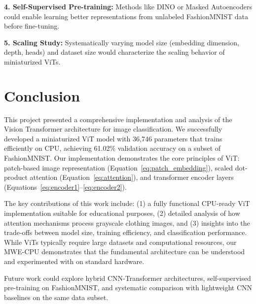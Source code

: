 \documentclass{article}
\begin{document}
\textbf{4. Self-Supervised Pre-training:} Methods like DINO \citep{caron2021dino} or Masked Autoencoders could enable learning better representations from unlabeled FashionMNIST data before fine-tuning.

\textbf{5. Scaling Study:} Systematically varying model size (embedding dimension, depth, heads) and dataset size would characterize the scaling behavior of miniaturized ViTs.

\section{Conclusion}

This project presented a comprehensive implementation and analysis of the Vision Transformer architecture for image classification. We successfully developed a miniaturized ViT model with 36,746 parameters that trains efficiently on CPU, achieving 61.02\% validation accuracy on a subset of FashionMNIST. Our implementation demonstrates the core principles of ViT: patch-based image representation (Equation~\ref{eq:patch_embedding}), scaled dot-product attention (Equation~\ref{eq:attention}), and transformer encoder layers (Equations~\ref{eq:encoder1}--\ref{eq:encoder2}).

The key contributions of this work include: (1) a fully functional CPU-ready ViT implementation suitable for educational purposes, (2) detailed analysis of how attention mechanisms process grayscale clothing images, and (3) insights into the trade-offs between model size, training efficiency, and classification performance. While ViTs typically require large datasets and computational resources, our MWE-CPU demonstrates that the fundamental architecture can be understood and experimented with on standard hardware.

Future work could explore hybrid CNN-Transformer architectures, self-supervised pre-training on FashionMNIST, and systematic comparison with lightweight CNN baselines on the same data subset.



\end{document}

